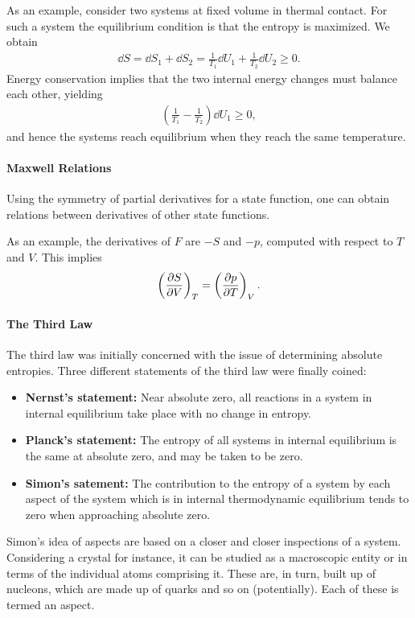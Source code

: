 As an example, consider two systems at fixed volume in thermal contact. For such a system the equilibrium condition is that the entropy is maximized. We obtain
\begin{align*}
	\dd{S} = \dd{S_{1}} + \dd{S_{2}} = \frac{1}{T_{1}}\dd{U_{1}} + \frac{1}{T_{2}}\dd{U_{2}} \geq 0.
\end{align*}
Energy conservation implies that the two internal energy changes must balance each other, yielding
\begin{align*}
	\left(\frac{1}{T_{1}} - \frac{1}{T_{2}}\right)\dd{U_{1}} \geq 0,
\end{align*}
and hence the systems reach equilibrium when they reach the same temperature.

\paragraph{Maxwell Relations}
Using the symmetry of partial derivatives for a state function, one can obtain relations between derivatives of other state functions.

As an example, the derivatives of $F$ are $-S$ and $-p$, computed with respect to $T$ and $V$. This implies
\begin{align*}
	\left(\pdv{S}{V}\right)_{T} = \left(\pdv{p}{T}\right)_{V}.
\end{align*}

\paragraph{The Third Law}
The third law was initially concerned with the issue of determining absolute entropies. Three different statements of the third law were finally coined:

\begin{itemize}
	\item \textbf{Nernst's statement:} Near absolute zero, all reactions in a system in internal equilibrium take place with no change in entropy.
	\item \textbf{Planck's statement:} The entropy of all systems in internal equilibrium is the same at absolute zero, and may be taken to be zero.
	\item \textbf{Simon's satement:} The contribution to the entropy of a system by each aspect of the system which is in internal thermodynamic equilibrium tends to zero when approaching absolute zero.
\end{itemize}

Simon's idea of aspects are based on a closer and closer inspections of a system. Considering a crystal for instance, it can be studied as a macroscopic entity or in terms of the individual atoms comprising it. These are, in turn, built up of nucleons, which are made up of quarks and so on (potentially). Each of these is termed an aspect.

